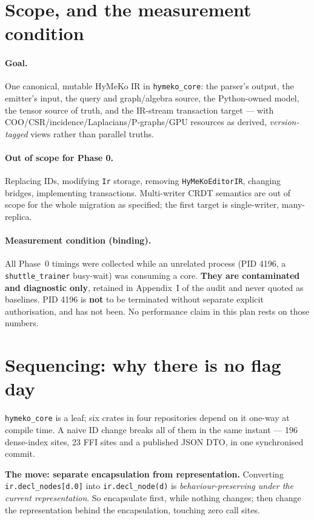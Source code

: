 \documentclass[11pt,a4paper]{article}
\newcommand{\code}[1]{\texttt{#1}}
\begin{document}
\section{Scope, and the measurement condition}

\paragraph{Goal.} One canonical, mutable HyMeKo IR in \code{hymeko\_core}: the
parser's output, the emitter's input, the query and graph/algebra source, the
Python-owned model, the tensor source of truth, and the IR-stream transaction
target --- with COO/CSR/incidence/Laplacians/P-graphs/GPU resources as derived,
\emph{version-tagged} views rather than parallel truths.

\paragraph{Out of scope for Phase 0.} Replacing IDs, modifying \code{Ir}
storage, removing \code{HyMeKoEditorIR}, changing bridges, implementing
transactions. Multi-writer CRDT semantics are out of scope for the whole
migration as specified; the first target is single-writer, many-replica.

\paragraph{Measurement condition (binding).} All Phase~0 timings were collected
while an unrelated process (PID 4196, a \code{shuttle\_trainer} busy-wait) was
consuming a core. \textbf{They are contaminated and diagnostic only}, retained
in Appendix~I of the audit and never quoted as baselines. PID 4196 is
\textbf{not} to be terminated without separate explicit authorisation, and has
not been. No performance claim in this plan rests on those numbers.

\section{Sequencing: why there is no flag day}

\code{hymeko\_core} is a leaf; six crates in four repositories depend on it
one-way at compile time. A naive ID change breaks all of them in the same
instant --- 196 dense-index sites, 23 FFI sites and a published JSON DTO, in one
synchronised commit.

\medskip
\noindent
\textbf{The move: separate encapsulation from representation.} Converting
\code{ir.decl\_nodes[d.0]} into \code{ir.decl\_node(d)} is
\emph{behaviour-preserving under the current representation}. So encapsulate
first, while nothing changes; then change the representation behind the
encapsulation, touching zero call sites.
\end{document}
